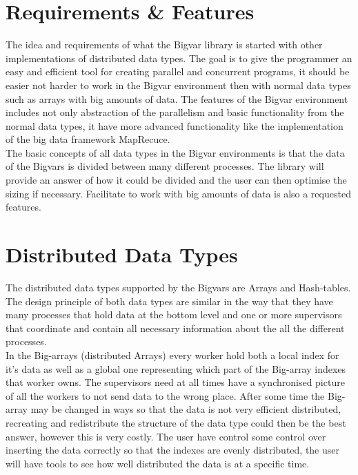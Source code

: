 \section{Requirements \& Features}
The idea and requirements of what the Bigvar library is started with other implementations of distributed data types. The goal is to give the programmer an easy and efficient tool for creating parallel and concurrent programs, it should be easier not harder to work in the Bigvar environment then with normal data types such as arrays with big amounts of data. The features of the Bigvar environment includes not only abstraction of the parallelism and basic functionality from the normal data types, it have more advanced functionality like the implementation of the big data framework MapRecuce. \\

The basic concepts of all data types in the Bigvar environments is that the data of the Bigvars is divided between many different processes. The library will provide an answer of how it could be divided and the user can then optimise the sizing if necessary. Facilitate to work with big amounts of data is also a requested features. 

\section{Distributed Data Types}
The distributed data types supported by the Bigvars are Arrays and Hash-tables. The design principle of both data types are similar in the way that they have many processes that hold data at the bottom level and one or more supervisors that coordinate and contain all necessary information about the all the different processes.\\

In the Big-arrays (distributed Arrays) every worker hold both a local index for it’s data as well as a global one representing which part of the Big-array indexes that worker owns. The supervisors need at all times have a synchronised picture of all the workers to not send data to the wrong place. After some time the Big-array may be changed in ways so that the data is not very efficient distributed, recreating and redistribute the structure of the data type could then be the best answer, however this is very costly. The user have control some control over inserting the data correctly so that the indexes are evenly distributed, the user will have tools to see how well distributed the data is at a specific time. \\

